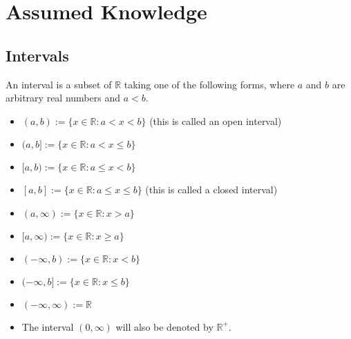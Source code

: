 \documentclass[12pt]{article}
\begin{document}

\tableofcontents
\pagebreak

\section{Assumed Knowledge}
	\subsection{Intervals}
		\begin{defn}
			An interval is a subset of $\mathbb{R}$ taking one of the following forms, where $a$ and $b$ are arbitrary real numbers and $a < b$.

			\begin{itemize}
				\item $(a,b) := \{x \in \mathbb{R}: a < x < b\}$ (this is called an open interval)
				\item $(a,b] := \{x \in \mathbb{R}: a < x \leq b\}$	
				\item $[a,b) := \{x \in \mathbb{R}: a \leq x < b\}$		
				\item $[a,b] := \{x \in \mathbb{R}: a \leq x \leq b\}$ (this is called a closed interval)
				\item $(a,\infty) := \{x \in \mathbb{R}: x > a\}$		
				\item $[a,\infty) := \{x \in \mathbb{R}: x \geq a\}$		
				\item $(-\infty,b) := \{x \in \mathbb{R}: x < b\}$		
				\item $(-\infty,b] := \{x \in \mathbb{R}: x \leq b\}$
				\item $(-\infty, \infty) := \mathbb{R}$
				\item The interval $(0, \infty)$ will also be denoted by $\mathbb{R}^+$.
			\end{itemize}

		\end{defn}
\end{document}
